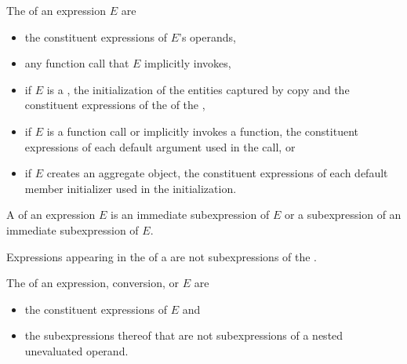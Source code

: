 \pnum
The  of an expression $E$ are
\begin{itemize}
\item
the constituent expressions of $E$'s operands,
\item
any function call that $E$ implicitly invokes,
\item
if $E$ is a ,
the initialization of the entities captured by copy and
the constituent expressions of the  of the ,
\item
if $E$ is a function call or implicitly invokes a function,
the constituent expressions of each default argument
used in the call, or
\item
if $E$ creates an aggregate object,
the constituent expressions of each default member initializer
used in the initialization.
\end{itemize}

\pnum
A  of an expression $E$ is
an immediate subexpression of $E$ or
a subexpression of an immediate subexpression of $E$.
\begin{note}
Expressions appearing in the  of a 
are not subexpressions of the .
\end{note}
The  of
an expression, conversion, or  $E$ are
\begin{itemize}
\item
the constituent expressions of $E$ and
\item
the subexpressions thereof that
are not subexpressions of a nested unevaluated operand.
\end{itemize}

